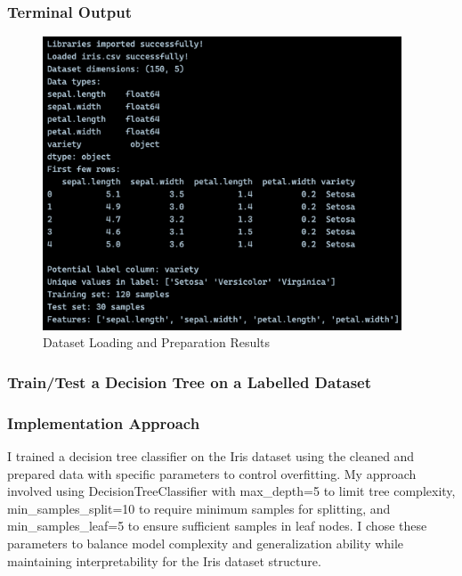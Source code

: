 \documentclass[12pt,a4paper]{article}
\begin{document}
\subsubsection{Terminal Output}
\begin{figure}[h!]
\centering
    \includegraphics[width=0.95\textwidth]{Figures/loading.png}
    \caption{Dataset Loading and Preparation Results}
\end{figure}

\newpage 

\subsubsection{Train/Test a Decision Tree on a Labelled Dataset}

\subsubsection{Implementation Approach}
I trained a decision tree classifier on the Iris dataset using the cleaned and prepared data with specific parameters to control overfitting. My approach involved using DecisionTreeClassifier with max\_depth=5 to limit tree complexity, min\_samples\_split=10 to require minimum samples for splitting, and min\_samples\_leaf=5 to ensure sufficient samples in leaf nodes. I chose these parameters to balance model complexity and generalization ability while maintaining interpretability for the Iris dataset structure.
\end{document}
